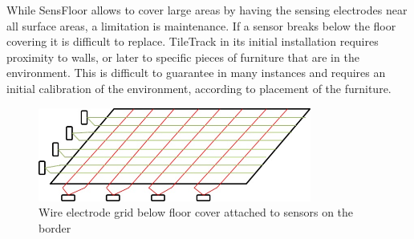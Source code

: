 While SensFloor allows to cover large areas by having the sensing electrodes near all surface areas, a limitation is maintenance. If a sensor breaks below the floor covering it is difficult to replace. TileTrack in its initial installation requires proximity to walls, or later to specific pieces of furniture that are in the environment. This is difficult to guarantee in many instances and requires an initial calibration of the environment, according to placement of the furniture.

\begin{figure}[h]
\centering
\includegraphics[width=0.8\textwidth]{images/capfloor_concept}
\caption{Wire electrode grid below floor cover attached to sensors on the border}
\label{fig:capfloor_concept}
\end{figure}

